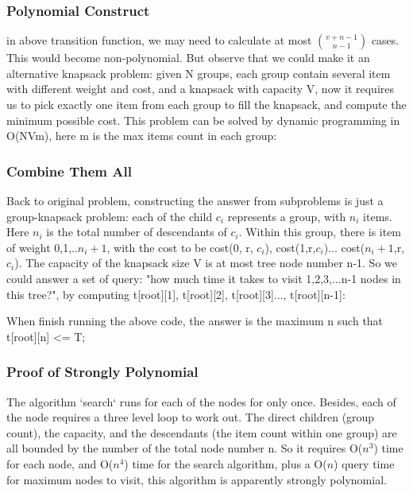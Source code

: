 \documentclass[paper=a4, fontsize=11pt]{scrartcl} %
\numberwithin{equation}{section} %
\numberwithin{figure}{section} %
\numberwithin{table}{section} %
\begin{document}
\subsubsection*{\textbf{Polynomial Construct}} in above transition function, we may need to
calculate at most $ {v + n - 1\choose n - 1} $ cases. This would become
non-polynomial. But observe that we could make it an alternative knapsack
problem: given N groups, each group contain several item with different weight
and cost, and a knapsack with capacity V, now it requires us to pick exactly
one item from each group to fill the knapsack, and compute the minimum possible
cost. This problem can be solved by dynamic programming in O(NVm), here m is
the max items count in each group:


\subsubsection*{\textbf{Combine Them All}} Back to original problem, constructing the
answer from subproblems is just a group-knapsack problem: each of the child
$c_i$ represents a group, with $n_i$ items. Here $n_i$ is the total number of
descendants of $c_i$. Within this group, there is item of weight 0,1,..$n_i +
1$, with the cost to be cost(0, r, $c_i$), cost(1,r,$c_i$)...
cost($n_i+1$,r,$c_i$). The capacity of the knapsack size V is at most tree node
number n-1. So we could answer a set of query: "how much time it takes to visit
1,2,3,...n-1 nodes in this tree?", by computing t[root][1], t[root][2],
t[root][3]..., t[root][n-1]:



When finish running the above code, the answer is the maximum n such that
t[root][n] <= T;

\subsubsection*{\textbf{Proof of Strongly Polynomial}} The algorithm `search` runs for
each of the nodes for only once. Besides, each of the node requires a three
level loop to work out. The direct children (group count), the capacity,
and the descendants (the item count within one group) are all bounded by
the number of the total node number n. So it requires O($n^3$) time for
each node, and O($n^4$) time for the search algorithm, plus a O($n$) query
time for maximum nodes to visit, this algorithm is apparently strongly
polynomial.


\end{document}

